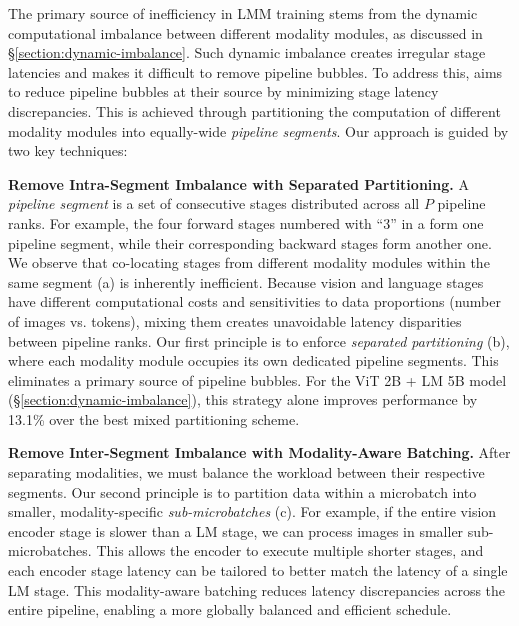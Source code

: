 The primary source of inefficiency in LMM training stems from the dynamic computational imbalance between different modality modules, as discussed in \S\ref{section:dynamic-imbalance}.
Such dynamic imbalance creates irregular stage latencies and makes it difficult to remove pipeline bubbles.
To address this, \sys{} aims to reduce pipeline bubbles at their source by minimizing stage latency discrepancies.
This is achieved through partitioning the computation of different modality modules into equally-wide \emph{pipeline segments}.
Our approach is guided by two key techniques:

\textbf{ Remove Intra-Segment Imbalance with Separated Partitioning.}
A \emph{pipeline segment} is a set of consecutive stages distributed across all $P$ pipeline ranks.
For example, the four forward stages numbered with ``3'' in a form one pipeline segment,
while their corresponding backward stages form another one.
We observe that co-locating stages from different modality modules within the same segment (a) is inherently inefficient. Because vision and language stages have different computational costs and sensitivities to data proportions (\eg number of images vs. tokens), mixing them creates unavoidable latency disparities between pipeline ranks. Our first principle is to enforce \emph{separated partitioning} (b), where each modality module occupies its own dedicated pipeline segments. This eliminates a primary source of pipeline bubbles. For the ViT 2B + LM 5B model (\S\ref{section:dynamic-imbalance}), this strategy alone improves performance by 13.1\% over the best mixed partitioning scheme.

\textbf{ Remove Inter-Segment Imbalance with Modality-Aware Batching.}
After separating modalities, we must balance the workload between their respective segments. Our second principle is to partition data within a microbatch into smaller, modality-specific \emph{sub-microbatches} (c). For example, if the entire vision encoder stage is slower than a LM stage, we can process images in smaller sub-microbatches.
This allows the encoder to execute multiple shorter stages, and each encoder stage latency can be tailored to better match the latency of a single LM stage.
This modality-aware batching reduces latency discrepancies across the entire pipeline, enabling a more globally balanced and efficient schedule.

